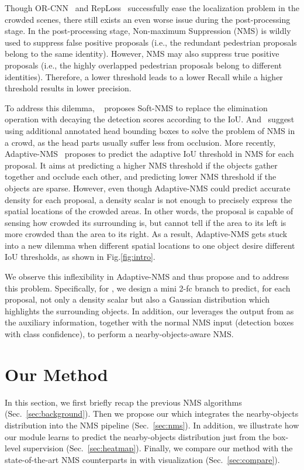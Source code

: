 \documentclass[sigconf]{acmart}
\begin{document}
Though OR-CNN~\cite{orcnn} and RepLoss~\cite{repulsion-loss} successfully ease the localization problem in the crowded scenes, there still exists an even worse issue during the post-processing stage. In the post-processing stage, Non-maximum Suppression (NMS) is wildly used to suppress false positive proposals (i.e., the redundant pedestrian proposals belong to the same identity). However, NMS may also suppress true positive proposals (i.e., the highly overlapped pedestrian proposals belong to different identities). Therefore, a lower threshold leads to a lower Recall while a higher threshold results in lower precision.

To address this dilemma, ~\cite{soft-nms} proposes Soft-NMS to replace the elimination operation with decaying the detection scores according to the IoU. And~\cite{doubleanchor,jointdet} suggest using additional annotated head bounding boxes to solve the problem of NMS in a crowd, as the head parts usually suffer less from occlusion. More recently, Adaptive-NMS~\cite{adaptive-nms} proposes to predict the adaptive IoU threshold in NMS for each proposal. It aims at predicting a higher NMS threshold if the objects gather together and occlude each other, and predicting lower NMS threshold if the objects are sparse. However, even though Adaptive-NMS could predict accurate density for each proposal, a density scalar is not enough to precisely express the spatial locations of the crowded areas. In other words, the proposal is capable of sensing how crowded its surrounding is, but cannot tell if the area to its left is more crowded than the area to its right. As a result, Adaptive-NMS gets stuck into a new dilemma when different spatial locations to one object desire different IoU thresholds, as shown in Fig.\ref{fig:intro}.

We observe this inflexibility in Adaptive-NMS and thus propose \heatmapnameshort{} and \nmsname{} to address this problem. Specifically, for \heatmapnameshort{}{}, we design a mini 2-fc branch to predict, for each proposal, not only a density scalar but also a Gaussian distribution which highlights the surrounding objects. In addition, our \nmsname{} leverages the output from \heatmapnameshort{} as the auxiliary information, together with the normal NMS input (detection boxes with class confidence), to perform a nearby-objects-aware NMS.

\section{Our Method}
In this section, we first briefly recap the previous NMS algorithms (Sec.~\ref{sec:background}). Then we propose our \nmsname{} which integrates the nearby-objects distribution into the NMS pipeline (Sec.~\ref{sec:nms}). In addition, we illustrate how our \heatmapnameshort{} module learns to predict the nearby-objects distribution just from the box-level supervision (Sec.~\ref{sec:heatmap}). Finally, we compare our method with the state-of-the-art NMS counterparts in with visualization (Sec.~\ref{sec:compare}).
\end{document}
